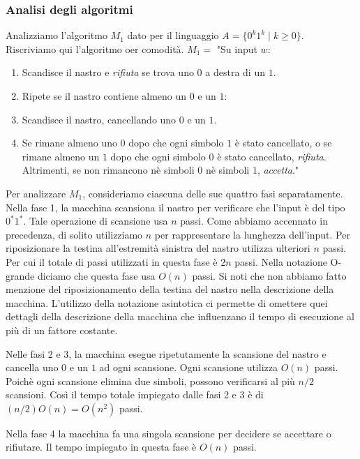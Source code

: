 \documentclass{article}
\begin{document}
\subsubsection{Analisi degli algoritmi}
Analizziamo l'algoritmo $M_1$ dato per il linguaggio $A = \{0^k1^k \mid k \geq 0 \}$.
Riscriviamo qui l'algoritmo oer comodità.
\vspace{1em}
\text{}
\newline
$M_1 =$ "Su input $w$:
\begin{enumerate}
    \item Scandisce il nastro e \textit{rifiuta} se trova uno $0$ a destra di un $1$.
    \item Ripete se il nastro contiene almeno un $0$ e un $1$:
    \item \quad Scandisce il nastro, cancellando uno $0$ e un $1$.
    \item Se rimane almeno uno $0$ dopo che ogni simbolo $1$  è stato cancellato, o se rimane almeno un $1$ dopo che ogni simbolo $0$ è stato cancellato, \textit{rifiuta}. Altrimenti, se non rimancono nè simboli $0$ nè simboli $1$, \textit{accetta}."
\end{enumerate}
\vspace{1em}
\text{}
Per analizzare $M_1$, consideriamo ciascuna delle sue quattro fasi separatamente.
Nella fase 1, la macchina scansiona il nastro per verificare che l'input è del tipo $0^*1^*$.
Tale operazione di scansione usa $n$ passi.
Come abbiamo accennato in precedenza, di solito utilizziamo $n$ per rappresentare la lunghezza dell'input.
Per riposizionare la testina all'estremità sinistra del nastro utilizza ulteriori $n$ passi.
Per cui il totale di passi utilizzati in questa fase è $2n$ passi.
Nella notazione O-grande diciamo che questa fase usa $O(n)$ passi.
Si noti che non abbiamo fatto menzione del riposizionamento della testina del nastro nella descrizione della macchina.
L'utilizzo della notazione asintotica ci permette di omettere quei dettagli della descrizione della macchina che influenzano il tempo di esecuzione al più di un fattore costante.

Nelle fasi 2 e 3, la macchina esegue ripetutamente la scansione del nastro e cancella uno $0$ e un $1$ ad ogni scansione.
Ogni scansione utilizza $O(n)$ passi.
Poichè ogni scansione elimina due simboli, possono verificarsi al più $n/2$ scansioni.
Così il tempo totale impiegato dalle fasi 2 e 3 è di $(n/2)O(n) = O(n^2)$ passi.

Nella fase 4 la macchina fa una singola scansione per decidere se accettare o rifiutare.
Il tempo impiegato in questa fase è $O(n)$ passi.
\end{document}
